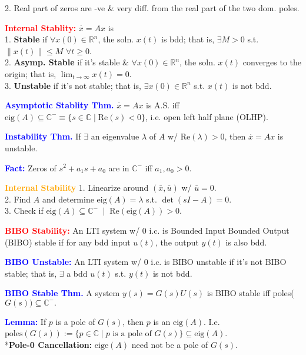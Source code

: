 \documentclass[5pt]{extarticle} %
\begin{document}
\begin{paracol}{3}
{    2. Real part of zeros are -ve \& very diff. from the real part of the two dom. poles. 

    \textcolor{red}{\textbf{Internal Stablity:}} $\overset{\cdot}{x} = Ax$ is \\
    1. \textbf{Stable} if $\forall x(0) \in \mathbb{R}^n$, the soln. $x(t)$ is bdd; that is, $\exists M > 0$ s.t. $\|x(t)\| \leq M$ $\forall t \geq 0$. \\
    2. \textbf{Asymp. Stable} if it's stable \& $\forall x(0) \in \mathbb{R}^n$, the soln. $x(t)$ converges to the origin; that is, $\lim_{t \to \infty} x(t) = 0$. \\
    3. \textbf{Unstable} if it's not stable; that is, $\exists x(0) \in \mathbb{R}^n$ s.t. $x(t)$ is not bdd. 

    \textcolor{blue}{\textbf{Asymptotic Stablity Thm.}} $\overset{\cdot}{x} = Ax$ is A.S. iff $\text{eig}(A) \subseteq \mathbb{C}^- \equiv \{s \in \mathbb{C} \mid \text{Re}(s) < 0\}$, i.e. open left half plane (OLHP).

    \textcolor{blue}{\textbf{Instability Thm.}} If $\exists$ an eigenvalue $\lambda$ of $A$ w/ $\text{Re}(\lambda) > 0$, then $\overset{\cdot}{x} = Ax$ is unstable.

    \textcolor{blue}{\textbf{Fact:}} Zeros of $s^2 + a_1 s + a_0$ are in $\mathbb{C}^-$ iff $a_1, a_0 > 0$.

    \textcolor{orange}{\textbf{Internal Stability}} 1. Linearize around $(\bar{x}, \bar{u})$ w/ $\bar{u} = 0$. \\
    2. Find $A$ and determine $\text{eig}(A) = \lambda$ s.t. $\det(s I - A) = 0$. \\ 
    3. Check if $\text{eig}(A) \subseteq \mathbb{C}^- \; \mid \; \text{Re}(\text{eig}(A)) > 0$.

    \textcolor{red}{\textbf{BIBO Stability:}} An LTI system w/ 0 i.c. is Bounded Input Bounded Output (BIBO) stable if for any bdd input $u(t)$, the output $y(t)$ is also bdd.

    \textcolor{blue}{\textbf{BIBO Unstable:}} An LTI system w/ 0 i.c. is BIBO unstable if it's not BIBO stable; that is, $\exists$ a bdd $u(t)$ s.t. $y(t)$ is not bdd.

    \textcolor{blue}{\textbf{BIBO Stable Thm.}} A system $y(s) = G(s) U(s)$ is BIBO stable iff poles($G(s)) \subseteq \mathbb{C}^{-}.$

    \textcolor{blue}{\textbf{Lemma:}} If $p$ is a pole of $G(s)$, then $p$ is an $\text{eig}(A)$. I.e. $\text{poles}(G(s)) := \{ p \in \mathbb{C} \mid p \text{ is a pole of } G(s) \} \subseteq \text{eig}(A)$.  \\
    *\textbf{Pole-0 Cancellation:} $\text{eige}(A)$ need not be a pole of $G(s)$.

}
\end{paracol}
\end{document}
